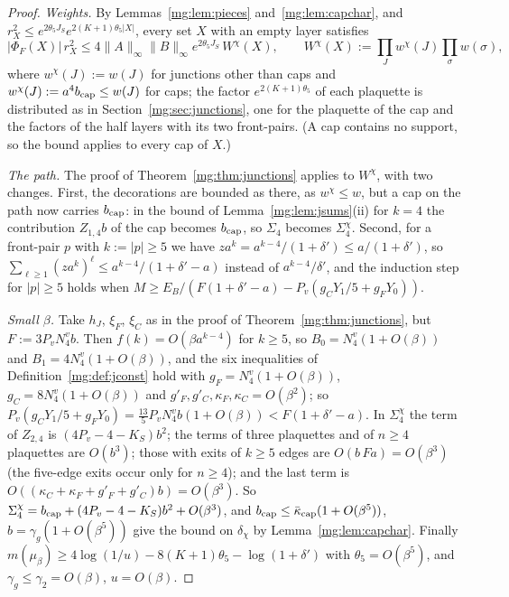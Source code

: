 \documentclass[11pt,a4paper]{article}
\theoremstyle{definition}
\theoremstyle{remark}
\newcommand{\norm}[1]{\lVert #1\rVert}
\begin{document}
\begin{proof}
\emph{Weights.} By Lemmas~\ref{mg:lem:pieces} and~\ref{mg:lem:capchar}, and $r_X^2\le e^{2\theta_5J_S}e^{2(K+1)\theta_5|X|}$, every set $X$ with an
empty layer satisfies
\[
|\Phi_F(X)|\,r_X^2\le4\norm A_\infty\norm B_\infty e^{2\theta_5J_S}\,W^\chi(X),\qquad W^\chi(X):=\prod_Jw^\chi(J)\prod_\sigma w(\sigma),
\]
where $w^\chi(J):=w(J)$ for junctions other than caps and $w^\chi(J):=a^4b_{\rm cap}\le w(J)$ for caps; the factor $e^{2(K+1)\theta_5}$ of each
plaquette is distributed as in Section~\ref{mg:sec:junctions}, one for the plaquette of the cap and the factors of the half layers with its two
front-pairs. (A cap contains no support, so the bound applies to every cap of $X$.)

\emph{The path.} The proof of Theorem~\ref{mg:thm:junctions} applies to $W^\chi$, with two changes. First, the decorations are bounded as there, as
$w^\chi\le w$, but a cap on the path now carries $b_{\rm cap}$: in the bound of Lemma~\ref{mg:lem:jsums}(ii) for $k=4$ the contribution $Z_{1,4}b$ of the
cap becomes $b_{\rm cap}$, so $\Sigma_4$ becomes $\Sigma_4^\chi$. Second, for a front-pair $p$ with $k:=|p|\ge5$ we have
$za^k=a^{k-4}/(1+\delta')\le a/(1+\delta')$, so $\sum_{\ell\ge1}(za^k)^\ell\le a^{k-4}/(1+\delta'-a)$ instead of $a^{k-4}/\delta'$, and the induction step for
$|p|\ge5$ holds when $M\ge E_B/(F(1+\delta'-a)-P_v(g_CY_1/5+g_FY_0))$.

\emph{Small $\beta$.} Take $h_J$, $\xi_F$, $\xi_C$ as in the proof of Theorem~\ref{mg:thm:junctions}, but $F:=3P_vN^v_4b$. Then $f(k)=O(\beta a^{k-4})$ for
$k\ge5$, so $B_0=N^v_4(1+O(\beta))$ and $B_1=4N^v_4(1+O(\beta))$, and the six inequalities of Definition~\ref{mg:def:jconst} hold with
$g_F=N^v_4(1+O(\beta))$, $g_C=8N^v_4(1+O(\beta))$ and $g'_F,g'_C,\kappa_F,\kappa_C=O(\beta^2)$; so $P_v(g_CY_1/5+g_FY_0)=\frac{13}5P_vN^v_4b(1+O(\beta))<
F(1+\delta'-a)$. In $\Sigma_4^\chi$ the term of $Z_{2,4}$ is $(4P_v-4-K_S)b^2$; the terms of three plaquettes and of $n\ge4$ plaquettes are $O(b^3)$; those
with exits of $k\ge5$ edges are $O(b\,Fa)=O(\beta^3)$ (the five-edge exits occur only for $n\ge4$); and the last term is
$O((\kappa_C+\kappa_F+g'_F+g'_C)b)=O(\beta^3)$. So $\Sigma_4^\chi=b_{\rm cap}+(4P_v-4-K_S)b^2+O(\beta^3)$, and
$b_{\rm cap}\le\bar\kappa_{\rm cap}(1+O(\beta^5))$, $b=\gamma_g(1+O(\beta^5))$ give the bound on $\delta_\chi$ by Lemma~\ref{mg:lem:capchar}. Finally
$m(\mu_\beta)\ge4\log(1/u)-8(K+1)\theta_5-\log(1+\delta')$ with $\theta_5=O(\beta^5)$, and $\gamma_g\le\gamma_2=O(\beta)$, $u=O(\beta)$.
\end{proof}
\end{document}
